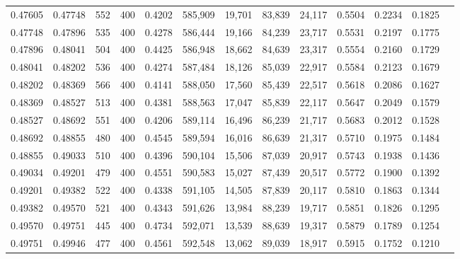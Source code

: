 \begin{tabular}{rrrrrrrrrrrrr}
0.47605 & 0.47748 &    552 &   400 &                                     0.4202 & 585,909 &  19,701 &  83,839 &  24,117 & 0.5504 & 0.2234 & 0.1825 \\
0.47748 & 0.47896 &    535 &   400 &                                     0.4278 & 586,444 &  19,166 &  84,239 &  23,717 & 0.5531 & 0.2197 & 0.1775 \\
0.47896 & 0.48041 &    504 &   400 &                                     0.4425 & 586,948 &  18,662 &  84,639 &  23,317 & 0.5554 & 0.2160 & 0.1729 \\
0.48041 & 0.48202 &    536 &   400 &                                     0.4274 & 587,484 &  18,126 &  85,039 &  22,917 & 0.5584 & 0.2123 & 0.1679 \\
0.48202 & 0.48369 &    566 &   400 &                                     0.4141 & 588,050 &  17,560 &  85,439 &  22,517 & 0.5618 & 0.2086 & 0.1627 \\
0.48369 & 0.48527 &    513 &   400 &                                     0.4381 & 588,563 &  17,047 &  85,839 &  22,117 & 0.5647 & 0.2049 & 0.1579 \\
0.48527 & 0.48692 &    551 &   400 &                                     0.4206 & 589,114 &  16,496 &  86,239 &  21,717 & 0.5683 & 0.2012 & 0.1528 \\
0.48692 & 0.48855 &    480 &   400 &                                     0.4545 & 589,594 &  16,016 &  86,639 &  21,317 & 0.5710 & 0.1975 & 0.1484 \\
0.48855 & 0.49033 &    510 &   400 &                                     0.4396 & 590,104 &  15,506 &  87,039 &  20,917 & 0.5743 & 0.1938 & 0.1436 \\
0.49034 & 0.49201 &    479 &   400 &                                     0.4551 & 590,583 &  15,027 &  87,439 &  20,517 & 0.5772 & 0.1900 & 0.1392 \\
0.49201 & 0.49382 &    522 &   400 &                                     0.4338 & 591,105 &  14,505 &  87,839 &  20,117 & 0.5810 & 0.1863 & 0.1344 \\
0.49382 & 0.49570 &    521 &   400 &                                     0.4343 & 591,626 &  13,984 &  88,239 &  19,717 & 0.5851 & 0.1826 & 0.1295 \\
0.49570 & 0.49751 &    445 &   400 &                                     0.4734 & 592,071 &  13,539 &  88,639 &  19,317 & 0.5879 & 0.1789 & 0.1254 \\
0.49751 & 0.49946 &    477 &   400 &                                     0.4561 & 592,548 &  13,062 &  89,039 &  18,917 & 0.5915 & 0.1752 & 0.1210 \\

\end{tabular}
